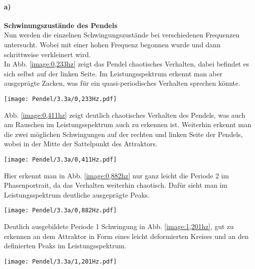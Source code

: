 \paragraph{a)} \textbf{Schwinungszustände des Pendels}\\
Nun werden die einzelnen Schwingungszustände bei verschiedenen Frequenzen untersucht. Wobei mit einer hohen Frequenz begonnen wurde und dann schrittweise verkleinert wird.\\

In Abb. \ref{image:0,233hz} zeigt das Pendel chaotisches Verhalten, dabei befindet es sich selbst auf der linken Seite. Im Leistungsspektrum erkennt man aber ausgeprägte Zacken, was für ein quasi-periodisches Verhalten sprechen könnte. 
\begin{center}
    \texttt{[image: Pendel/3.3a/0,233Hz.pdf]}
    \label{image:0,233hz}
\end{center}
Abb. \ref{image:0,411hz} zeigt deutlich chaotisches Verhalten des Pendels, was auch am Rauschen im Leistungsspektrum auch zu erkennen ist. Weiterhin erkennt man die zwei möglichen Schwingungen auf der rechten und linken Seite der Pendels, wobei in der Mitte der Sattelpunkt des Attraktors.
\begin{center}
    \texttt{[image: Pendel/3.3a/0,411Hz.pdf]}
    \label{image:0,411hz}
\end{center}
Hier erkennt man in Abb. \ref{image:0,882hz} nur ganz leicht die Periode 2 im Phasenportrait, da das Verhalten weiterhin chaotisch. Dafür sieht man im Leistungsspektrum deutliche ausgeprägte Peaks.
\begin{center}
    \texttt{[image: Pendel/3.3a/0,882Hz.pdf]}
    \label{image:0,882hz}
\end{center}
Deutlich ausgebildete Periode 1 Schwingung in Abb. \ref{image:1,201hz}, gut zu erkennen an dem Attraktor in Form eines leicht deformierten Kreises und an den definierten Peaks im Leistungsspektrum.
\begin{center}
    \texttt{[image: Pendel/3.3a/1,201Hz.pdf]}
    \label{image:1,201hz}
\end{center}
